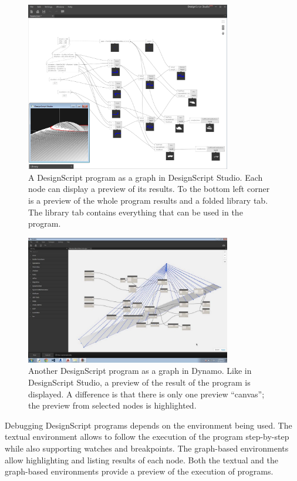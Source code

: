 \documentclass{./llncs2e/llncs}
\begin{document}
	\begin{figure}
		\centering
		\includegraphics[width=0.8\textwidth]{img/ds_dsstudio}
		\caption{A DesignScript program as a graph in DesignScript Studio. Each node can display a preview of its results. To the bottom left corner is a preview of the whole program results and a folded library tab. The library tab contains everything that can be used in the program.}
		\label{fig:ds:dsstudio}
	\end{figure} 
	
	\begin{figure}
		\centering
		\includegraphics[width=0.8\textwidth]{img/ds_dynamo}
		\caption{Another DesignScript program as a graph in Dynamo. Like in DesignScript Studio, a preview of the result of the program is displayed. A difference is that there is only one preview ``canvas''; the preview from selected nodes is highlighted.}
		\label{fig:ds:dynamo}
	\end{figure} 
	
	Debugging DesignScript programs depends on the environment being used. 
	The textual environment allows to follow the execution of the program step-by-step while also supporting watches and breakpoints. 
	The graph-based environments allow highlighting and listing results of each node. 
	Both the textual and the graph-based environments provide a preview of the execution of programs.
	
\end{document}
